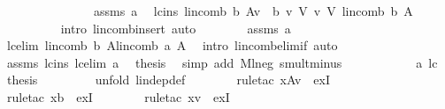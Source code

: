 \begin{isabellebody}
\ \ \ \ \isamarkupfalse%
\ {\isacharminus}\ \isanewline
\ \ \ \ \ \ \isamarkupfalse%
\ assms\ a\ \isamarkupfalse%
\ lc{\isacharunderscore}ins{\isacharcolon}\ {\isachardoublequoteopen}lincomb\ {\isacharquery}b\ {\isacharparenleft}A{\isasymunion}{\isacharbraceleft}v{\isacharbraceright}{\isacharparenright}\ {\isacharequal}\ {\isacharparenleft}{\isacharparenleft}{\isacharquery}b\ v{\isacharparenright}\ {\isasymodot}\isactrlbsub V\isactrlesub \ v{\isacharparenright}\ {\isasymoplus}\isactrlbsub V\isactrlesub \ lincomb\ {\isacharquery}b\ A{\isachardoublequoteclose}\ \isanewline
\ \ \ \ \ \ \ \ \isamarkupfalse%
\ {\isacharparenleft}intro\ lincomb{\isacharunderscore}insert{\isacharcomma}\ auto{\isacharparenright}\isanewline
\ \ \ \ \ \ \isamarkupfalse%
\ assms\ a\ \isamarkupfalse%
\ lc{\isacharunderscore}elim{\isacharcolon}\ {\isachardoublequoteopen}lincomb\ {\isacharquery}b\ A{\isacharequal}lincomb\ a\ A{\isachardoublequoteclose}\ \isamarkupfalse%
\ {\isacharparenleft}intro\ lincomb{\isacharunderscore}elim{\isacharunderscore}if{\isacharcomma}\ auto{\isacharparenright}\isanewline
\ \ \ \ \ \ \isamarkupfalse%
\ assms\ lc{\isacharunderscore}ins\ lc{\isacharunderscore}elim\ a\ \isamarkupfalse%
\ {\isacharquery}thesis\ \isamarkupfalse%
\ {\isacharparenleft}simp\ add{\isacharcolon}\ M{\isachardot}l{\isacharunderscore}neg\ smult{\isacharunderscore}minus{\isacharunderscore}{}{\isacharparenright}\isanewline
\ \ \ \ \isamarkupfalse%
\isanewline
\ \ \ \ \isamarkupfalse%
\ \ a\ lc{}\ \isamarkupfalse%
\ {\isacharquery}thesis\ \isanewline
\ \ \ \ \ \ \isamarkupfalse%
\ {\isacharparenleft}unfold\ lin{\isacharunderscore}dep{\isacharunderscore}def{\isacharparenright}\isanewline
\ \ \ \ \ \ \isamarkupfalse%
\ {\isacharparenleft}rule{\isacharunderscore}tac\ x{\isacharequal}{\isachardoublequoteopen}A{\isasymunion}{\isacharbraceleft}v{\isacharbraceright}{\isachardoublequoteclose}\ \ exI{\isacharparenright}\isanewline
\ \ \ \ \ \ \isamarkupfalse%
\ {\isacharparenleft}rule{\isacharunderscore}tac\ x{\isacharequal}{\isachardoublequoteopen}{\isacharquery}b{\isachardoublequoteclose}\ \ exI{\isacharparenright}\isanewline
\ \ \ \ \ \ \isamarkupfalse%
\ {\isacharparenleft}rule{\isacharunderscore}tac\ x{\isacharequal}{\isachardoublequoteopen}v{\isachardoublequoteclose}\ \ exI{\isacharparenright}\isanewline

\end{isabellebody}
